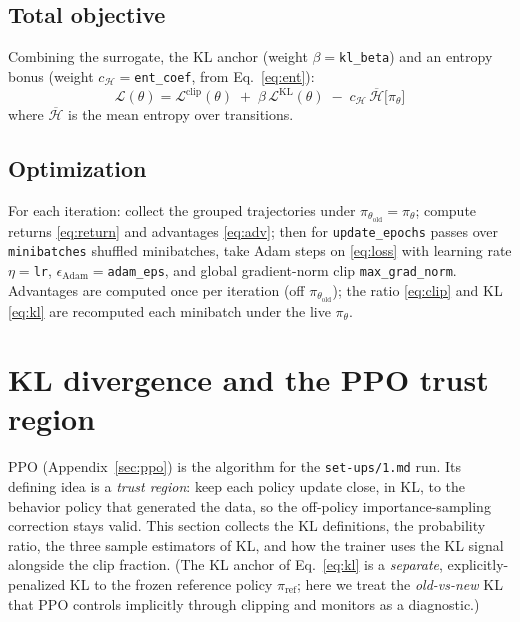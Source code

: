 \documentclass[11pt]{article}
\newcommand{\pol}{\pi_\theta}
\newcommand{\polold}{\pi_{\theta_{\mathrm{old}}}}
\newcommand{\polref}{\pi_{\mathrm{ref}}}
\begin{document}
\subsection{Total objective}
Combining the surrogate, the KL anchor (weight $\beta=$\texttt{kl\_beta}) and an entropy bonus
(weight $c_{\mathcal H}=$\texttt{ent\_coef}, from Eq.~\eqref{eq:ent}):
\begin{equation}
\boxed{\;
\mathcal{L}(\theta) =
\mathcal{L}^{\mathrm{clip}}(\theta)
\;+\; \beta\,\mathcal{L}^{\mathrm{KL}}(\theta)
\;-\; c_{\mathcal H}\,\overline{\mathcal{H}}\big[\pol\big]
\;}
\label{eq:loss}
\end{equation}
where $\overline{\mathcal H}$ is the mean entropy over transitions.

\subsection{Optimization}
For each iteration: collect the grouped trajectories under $\polold=\pol$; compute returns
\eqref{eq:return} and advantages \eqref{eq:adv}; then for \texttt{update\_epochs} passes over
\texttt{minibatches} shuffled minibatches, take Adam steps on \eqref{eq:loss} with learning
rate $\eta=$\texttt{lr}, $\epsilon_{\mathrm{Adam}}=$\texttt{adam\_eps}, and global gradient-norm
clip \texttt{max\_grad\_norm}. Advantages are computed once per iteration (off $\polold$); the
ratio \eqref{eq:clip} and KL \eqref{eq:kl} are recomputed each minibatch under the live $\pol$.

\section{KL divergence and the PPO trust region}\label{sec:kldiv}
PPO (Appendix~\ref{sec:ppo}) is the algorithm for the \texttt{set-ups/1.md} run. Its defining idea is a
\emph{trust region}: keep each policy update close, in KL, to the behavior policy that generated the
data, so the off-policy importance-sampling correction stays valid. This section collects the
KL definitions, the probability ratio, the three sample estimators of KL, and how the trainer uses the
KL signal alongside the clip fraction. (The KL anchor of Eq.~\eqref{eq:kl} is a \emph{separate},
explicitly-penalized KL to the frozen reference policy $\polref$; here we treat the
\emph{old-vs-new} KL that PPO controls implicitly through clipping and monitors as a diagnostic.)
\end{document}
